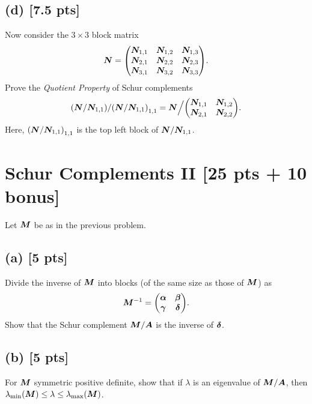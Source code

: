 \documentclass[twoside,10pt]{article}
\begin{document}
\subsection*{(d) [7.5 pts]}
Now consider the $3 \times 3$ block matrix 
\begin{equation}
  \mtx{N} = 
  \begin{pmatrix}
    \mtx{N}_{1, 1} & \mtx{N}_{1, 2} & \mtx{N}_{1, 3} \\
    \mtx{N}_{2, 1} & \mtx{N}_{2, 2} & \mtx{N}_{2, 3} \\
    \mtx{N}_{3, 1} & \mtx{N}_{3, 2} & \mtx{N}_{3, 3}
  \end{pmatrix}.
\end{equation}
Prove the \emph{Quotient Property} of Schur complements
\begin{equation}
  \left(\mtx{N} / \mtx{N}_{1, 1}\right) / \left(\mtx{N} / \mtx{N}_{1, 1}\right)_{1, 1} 
  = 
  \mtx{N} \Big / 
  \begin{pmatrix}
    \mtx{N}_{1, 1} & \mtx{N}_{1, 2} \\
    \mtx{N}_{2, 1} & \mtx{N}_{2, 2} 
  \end{pmatrix}.
\end{equation}
Here, $\left(\mtx{N} / \mtx{N}_{1, 1}\right)_{1, 1}$ is the top left block of $\bm{N} / \bm{N}_{1, 1}$. 


\section{Schur Complements II [25 pts + 10 bonus]}
Let $\bm{M}$ be as in the previous problem. 

\subsection*{(a) [5 pts]}
Divide the inverse of $\bm{M}$ into blocks (of the same size as those of $\bm{M}$) as
\begin{equation}
  \mtx{M}^{-1} = 
  \begin{pmatrix}
    \mtx{\alpha} & \mtx{\beta} \\
    \mtx{\gamma} & \mtx{\delta}
  \end{pmatrix}.
\end{equation}
Show that the Schur complement $\bm{M} / \bm{A}$ is the inverse of $\bm{\delta}$.

\subsection*{(b) [5 pts]} 
For $\bm{M}$ symmetric positive definite, show that if $\lambda$ is an eigenvalue of $\bm{M} / \bm{A}$, then $\lambda_{\min}\left(\mtx{M} \right) \leq \lambda \leq \lambda_{\max}\left(\mtx{M}\right)$.
\end{document}
